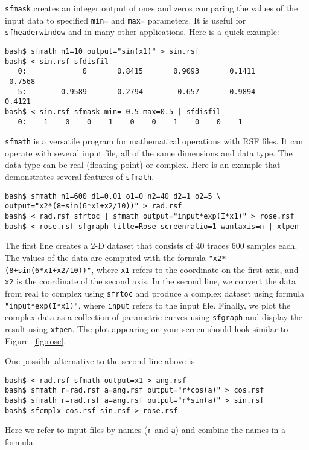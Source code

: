\noindent\doublebox{\parbox{\textwidth}{
    
  }}

\texttt{sfmask} creates an integer output of ones and zeros comparing
the values of the input data to specified \texttt{min=} and
\texttt{max=} parameters. It is useful for \texttt{sfheaderwindow} and
in many other applications. Here is a quick example:
\begin{verbatim}
bash$ sfmath n1=10 output="sin(x1)" > sin.rsf
bash$ < sin.rsf sfdisfil
   0:             0       0.8415       0.9093       0.1411      -0.7568
   5:       -0.9589      -0.2794        0.657       0.9894       0.4121
bash$ < sin.rsf sfmask min=-0.5 max=0.5 | sfdisfil
   0:    1    0    0    1    0    0    1    0    0    1
\end{verbatim}

\noindent\doublebox{\parbox{\textwidth}{
    
  }}


\texttt{sfmath} is a versatile program for mathematical operations
with RSF files. It can operate with several input file, all of the
same dimensions and data type. The data type can be real (floating
point) or complex. Here is an example that demonstrates several
features of \texttt{sfmath}.
\begin{verbatim}
bash$ sfmath n1=600 d1=0.01 o1=0 n2=40 d2=1 o2=5 \
output="x2*(8+sin(6*x1+x2/10))" > rad.rsf
bash$ < rad.rsf sfrtoc | sfmath output="input*exp(I*x1)" > rose.rsf
bash$ < rose.rsf sfgraph title=Rose screenratio=1 wantaxis=n | xtpen
\end{verbatim}

The first line creates a 2-D dataset that consists of 40 traces 600
samples each. The values of the data are computed with the formula
\verb#"x2*(8+sin(6*x1+x2/10))"#, where \texttt{x1} refers to the
coordinate on the first axis, and \texttt{x2} is the coordinate of the
second axis. In the second line, we convert the data from real to
complex using \texttt{sfrtoc} and produce a complex dataset using
formula \verb#"input*exp(I*x1)"#, where \texttt{input} refers to the
input file. Finally, we plot the complex data as a collection of
parametric curves using \texttt{sfgraph} and display the result using
\texttt{xtpen}.  The plot appearing on your screen should look similar
to Figure~\ref{fig:rose}.


One possible alternative to the second line above is
\begin{verbatim}
bash$ < rad.rsf sfmath output=x1 > ang.rsf
bash$ sfmath r=rad.rsf a=ang.rsf output="r*cos(a)" > cos.rsf
bash$ sfmath r=rad.rsf a=ang.rsf output="r*sin(a)" > sin.rsf
bash$ sfcmplx cos.rsf sin.rsf > rose.rsf
\end{verbatim}
Here we refer to input files by names (\texttt{r} and \texttt{a}) and combine the names in a formula.

